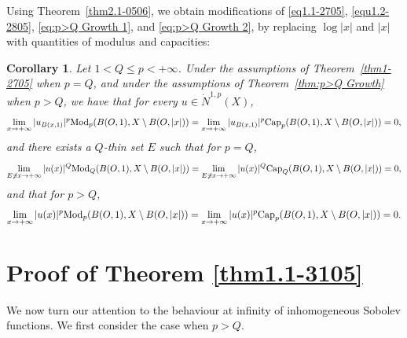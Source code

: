 \documentclass[10pt]{amsart}
\newtheorem{corollary}[theorem]{Corollary}
\numberwithin{equation}{section}
\begin{document}
Using Theorem~\ref{thm2.1-0506}, we obtain modifications of \eqref{eq1.1-2705}, \eqref{equ1.2-2805}, \eqref{eq:p>Q Growth 1}, and \eqref{eq:p>Q Growth 2}, by replacing $\log|x|$ and $|x|$ with quantities of modulus and capacities:

\begin{corollary}Let $1<Q\le p<+\infty$.
Under the assumptions of Theorem~\ref{thm1-2705} when $p=Q$, and under the assumptions of Theorem~\ref{thm:p>Q Growth} when $p>Q$, we have that for every $u\in\dot N^{1,p}(X)$, 
\[
\lim_{x\to+\infty} |u_{B(x,1)}|^p \text{\rm Mod}_p(B(O,1),X\setminus B(O,|x|)) =\lim_{x\to+\infty} |u_{B(x,1)}|^p \text{\rm Cap}_p(B(O,1),X\setminus B(O,|x|)) =0, 	 
 \]
 	and there exists a $Q$-thin set $E$ such that for $p=Q$,
\[
\lim_{E\not\ni x\to+\infty} |u(x)|^Q \text{\rm Mod}_Q(B(O,1),X\setminus B(O,|x|)) =\lim_{E\not\ni x\to+\infty} |u(x)|^Q \text{\rm Cap}_Q(B(O,1),X\setminus B(O,|x|)) =0,
\]
and  that for $p>Q$,
\[
\lim_{ x\to+\infty} |u(x)|^p \text{\rm Mod}_p(B(O,1),X\setminus B(O,|x|)) =\lim_{x\to+\infty} |u(x)|^p \text{\rm Cap}_p(B(O,1),X\setminus B(O,|x|)) =0.
\]
\end{corollary}



\section{Proof of Theorem \ref{thm1.1-3105}}
We now turn our attention to the behaviour at infinity of inhomogeneous Sobolev functions.  We first consider the case when $p>Q$.  
\end{document}

